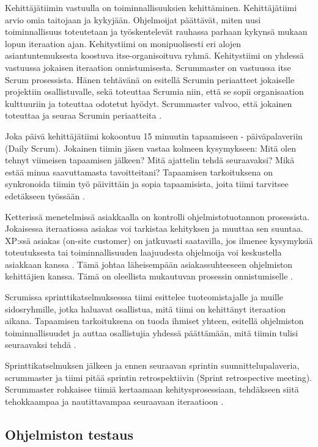\documentclass[finnish]{tktltiki2}
\theoremstyle{definition}
\theoremstyle{remark}
\begin{document}
Kehittäjätiimin vastuulla on toiminnallisuuksien kehittäminen. Kehittäjätiimi arvio omia taitojaan ja kykyjään. Ohjelmoijat päättävät, miten uusi toiminnallisuus toteutetaan ja työskentelevät rauhassa parhaan kykynsä mukaan lopun iteraation ajan. Kehitystiimi on monipuolisesti eri alojen asiantuntemuksesta koostuva itse-organisoituva ryhmä. Kehitystiimi on yhdessä vastuussa jokaisen iteraation onnistumisesta. Scrummaster on vastuussa itse Scrum prosessista. Hänen tehtävänä on esitellä Scrumin periaatteet jokaiselle projektiin osallistuvalle, sekä toteuttaa Scrumia niin, että se sopii organisaation kulttuuriin ja toteuttaa odotetut hyödyt. Scrummaster valvoo, että jokainen toteuttaa ja seuraa Scrumin periaatteita \cite{SCH09}.

Joka päivä kehittäjätiimi kokoontuu 15 minuutin tapaamiseen - päiväpalaveriin (Daily Scrum). Jokainen tiimin jäsen vastaa kolmeen kysymykseen: Mitä olen tehnyt viimeisen tapaamisen jälkeen? Mitä ajattelin tehdä seuraavaksi? Mikä estää minua saavuttamasta tavoitteitani? Tapaamisen tarkoituksena on synkronoida tiimin työ päivittäin ja sopia tapaamisista, joita tiimi tarvitsee edetäkseen työssään \cite{SCH09}.

Ketterissä menetelmissä asiakkaalla on kontrolli ohjelmistotuotannon prosessista. Jokaisessa iteraatiossa asiakas voi tarkistaa kehityksen ja muuttaa sen suuntaa. XP:ssä asiakas (on-site customer) on jatkuvasti saatavilla, jos ilmenee kysymyksiä toteutuksesta tai toiminnallisuuden laajuudesta ohjelmoija voi keskustella asiakkaan kanssa \cite{BEC99}. Tämä johtaa läheisempään asiakassuhteeseen ohjelmiston kehittäjien kanssa. Tämä on oleellista mukautuvan prosessin onnistumiselle \cite{FOW01a}.

Scrumissa sprinttikatselmuksesssa tiimi esittelee tuoteomistajalle ja muille sidosryhmille, jotka haluavat osallistua, mitä tiimi on kehittänyt iteraation aikana. Tapaamisen tarkoituksena on tuoda ihmiset yhteen, esitellä ohjelmiston toiminnallisuudet ja auttaa osallistujia yhdessä päättämään, mitä tiimin tulisi seuraavaksi tehdä \cite{SCH09}. 

Sprinttikatselmuksen jälkeen ja ennen seuraavan sprintin suunnittelupalaveria, scrummaster ja tiimi pitää sprintin retrospektiivin (Sprint retrospective meeting). Scrummaster rohkaisee tiimiä kertaamaan kehitysprosessiaan, tehdäkseen siitä tehokkaampaa ja nautittavampaa seuraavaan iteraatioon \cite{SCH09}.

\subsection{Ohjelmiston testaus}
\end{document}
